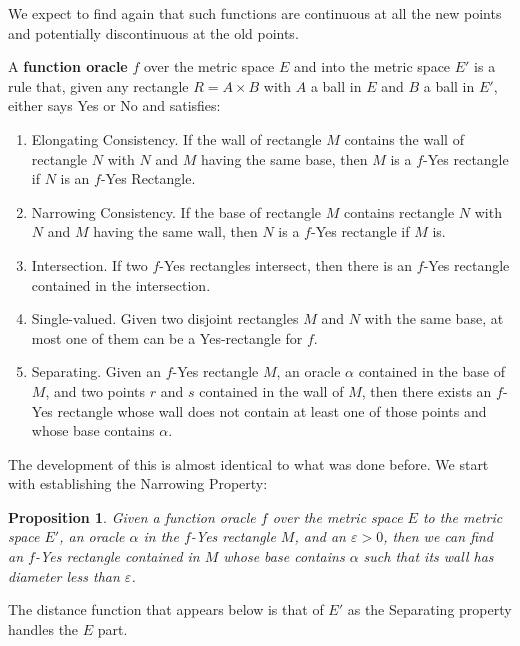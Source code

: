 \documentclass[12pt]{article}
\newtheorem{proposition}{Proposition}[section]
\begin{document}
We expect to find again that such functions are continuous at all the new points and potentially discontinuous at the old points. 


A \textbf{function oracle} $f$ over the metric space $E$ and into the metric space $E'$ is a rule that, given any rectangle $R= A \times B$ with $A$ a ball in $E$ and $B$ a ball in  $E'$, either says Yes or No and satisfies: 
\begin{enumerate}
    \item Elongating Consistency. If the wall of rectangle $M$ contains the wall of rectangle $N$ with $N$ and $M$ having the same base,  then $M$ is a $f$-Yes rectangle if $N$  is an $f$-Yes Rectangle. 
    \item Narrowing Consistency. If the base of rectangle $M$ contains rectangle $N$ with $N$ and $M$ having the same wall, then $N$ is a $f$-Yes rectangle if $M$ is. 
    \item Intersection. If two $f$-Yes rectangles intersect, then there is an $f$-Yes rectangle contained in the intersection. 
    \item Single-valued. Given two disjoint rectangles $M$ and $N$ with the same base, at most one of them can be a Yes-rectangle for $f$. 
    \item Separating. Given an $f$-Yes rectangle $M$, an oracle $\alpha$ contained in the base of $M$, and two points $r$ and $s$ contained in the wall of $M$, then there exists an $f$-Yes rectangle whose wall does not contain at least one of those points and whose base contains $\alpha$.
\end{enumerate} 

The development of this is almost identical to what was done before. We start with establishing the Narrowing Property: 

\begin{proposition}\label{pr:metricfshrink}
Given a function oracle $f$ over the metric space $E$ to the metric space $E'$, an oracle $\alpha$ in the $f$-Yes rectangle $M$, and an $\varepsilon > 0$, then we can find an $f$-Yes rectangle contained in $M$ whose base contains $\alpha$ such that its wall has diameter less than $\varepsilon$.
\end{proposition}

The distance function that appears below is that of $E'$ as the Separating property handles the $E$ part. 
\end{document}
